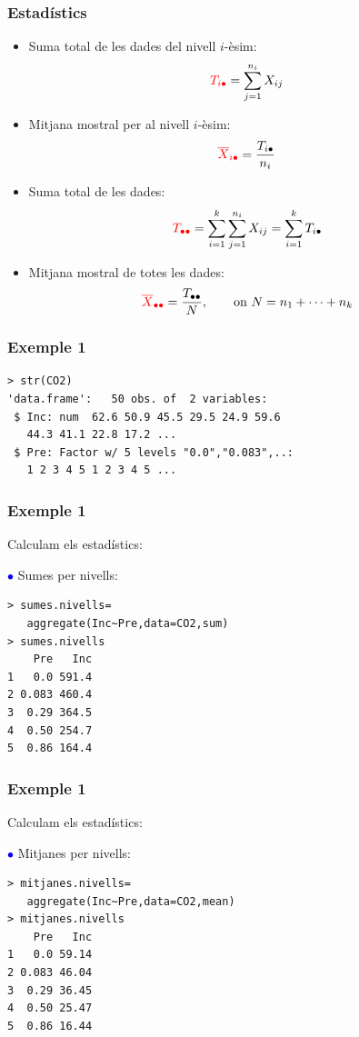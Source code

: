 \documentclass[12pt,t]{beamer}
\newcommand{\red}[1]{\textcolor{red}{#1}}
\newcommand{\blue}[1]{\textcolor{blue}{#1}}
\theoremstyle{plain}
\theoremstyle{definition}
\begin{document}
\begin{frame}
\frametitle{Estadístics}
\begin{itemize}
\item Suma total de les dades del nivell $i$-èsim: $$\red{T_{i\bullet}}
=\sum_{j=1}^{n_i} X_{ij}$$
\item Mitjana mostral per al nivell $i$-èsim: $$\red{\overline{X}_{i\bullet}} =
\frac{T_{i\bullet}}{n_i}$$
\item Suma total de les dades: $$\red{T_{\bullet\bullet}}=\sum_{i=1}^k
\sum_{j=1}^{n_i} X_{ij} =\sum_{i=1}^k T_{i\bullet}$$
\item Mitjana mostral de totes les dades: $$\red{\overline{X}_{\bullet\bullet}}
=\frac{T_{\bullet\bullet}}{N}, \qquad \mbox{on } N=n_1+\cdots + n_k$$
\end{itemize}
\end{frame}


\begin{frame}[fragile]
\frametitle{Exemple 1}

\begin{verbatim}
> str(CO2)
'data.frame':	50 obs. of  2 variables:
 $ Inc: num  62.6 50.9 45.5 29.5 24.9 59.6 
   44.3 41.1 22.8 17.2 ...
 $ Pre: Factor w/ 5 levels "0.0","0.083",..: 
   1 2 3 4 5 1 2 3 4 5 ...
\end{verbatim}

\end{frame}


\begin{frame}[fragile]
\frametitle{Exemple 1}
\vspace*{-2ex}

Calculam els estadístics:\medskip

\blue{$\mathbf \bullet$} Sumes per nivells:

\begin{verbatim}
> sumes.nivells=
   aggregate(Inc~Pre,data=CO2,sum)
> sumes.nivells
    Pre   Inc
1   0.0 591.4
2 0.083 460.4
3  0.29 364.5
4  0.50 254.7
5  0.86 164.4
\end{verbatim}
\end{frame}



\begin{frame}[fragile]
\frametitle{Exemple 1}
Calculam els estadístics:\medskip

\blue{$\mathbf \bullet$} Mitjanes per nivells:

\begin{verbatim}
> mitjanes.nivells=
   aggregate(Inc~Pre,data=CO2,mean)
> mitjanes.nivells
    Pre   Inc
1   0.0 59.14
2 0.083 46.04
3  0.29 36.45
4  0.50 25.47
5  0.86 16.44
\end{verbatim}

\end{frame}
\end{document}
